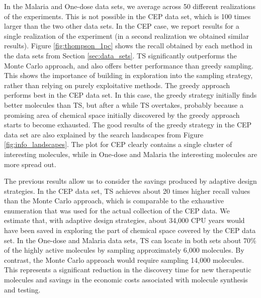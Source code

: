 In the Malaria and One-dose data sets, we average across 50 different realizations of the experiments. This is not possible in the CEP data set, which is 100 times larger than the two other data sets. In the CEP case, we report results for a single realization of the experiment (in a second realization we obtained similar results). 
Figure \ref{fig:thompson_1pc} shows the recall obtained by each method in the data sets from 
Section \ref{sec:data_sets}. TS significantly outperforms the Monte Carlo approach, and also offers better performance than greedy sampling. This shows the importance of building in exploration into the sampling strategy, rather than relying on purely exploitative methods. The greedy approach performs best in the CEP data set. In this case, the greedy strategy initially finds better molecules than TS, but after a while TS overtakes, probably because a promising area of chemical space 
initially discovered by the greedy approach starts to become exhausted. The good results of the greedy strategy in the CEP data set are also explained by the search landscapes from Figure \ref{fig:info_landscapes}. The plot for CEP clearly contains a single cluster of interesting molecules, while in One-dose and Malaria the interesting molecules are more spread out.

The previous results allow us to consider the savings produced by adaptive design strategies. In the CEP data set, TS achieves about 20 times higher recall values than the Monte Carlo approach, which is comparable to the exhaustive enumeration that was used for the actual collection of the CEP data. We estimate that, with adaptive design strategies, about 34,000 CPU years would have been saved in exploring the part of chemical space covered by the CEP data set. In the One-dose and Malaria data sets, TS can locate in both sets about 70\% of the highly active molecules by sampling approximately 6,000 molecules. By contrast, the Monte Carlo approach would require sampling 14,000 molecules. This represents a significant reduction in the discovery time for new therapeutic molecules and savings in the economic costs associated with molecule synthesis and testing.

